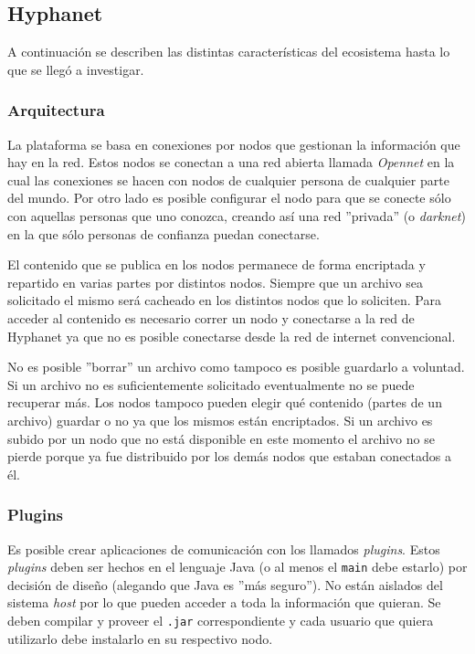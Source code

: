 \subsection{Hyphanet}

A continuación se describen las distintas características del ecosistema hasta lo que se llegó a investigar.

\subsubsection{Arquitectura}

La plataforma se basa en conexiones por nodos que gestionan la información que hay en la red. Estos nodos se conectan a una red abierta llamada \textit{Opennet} en la cual las conexiones se hacen con nodos de cualquier persona de cualquier parte del mundo. Por otro lado es posible configurar el nodo para que se conecte sólo con aquellas personas que uno conozca, creando así una red ''privada'' (o \textit{darknet}) en la que sólo personas de confianza puedan conectarse.

El contenido que se publica en los nodos permanece de forma encriptada y repartido en varias partes por distintos nodos. Siempre que un archivo sea solicitado el mismo será cacheado en los distintos nodos que lo soliciten. Para acceder al contenido es necesario correr un nodo y conectarse a la red de Hyphanet ya que no es posible conectarse desde la red de internet convencional.

No es posible ''borrar'' un archivo como tampoco es posible guardarlo a voluntad. Si un archivo no es suficientemente solicitado eventualmente no se puede recuperar más. Los nodos tampoco pueden elegir qué contenido (partes de un archivo) guardar o no ya que los mismos están encriptados. Si un archivo es subido por un nodo que no está disponible en este momento el archivo no se pierde porque ya fue distribuido por los demás nodos que estaban conectados a él.

\subsubsection{Plugins}

Es posible crear aplicaciones de comunicación con los llamados \textit{plugins}. Estos \textit{plugins} deben ser hechos en el lenguaje Java (o al menos el \texttt{main} debe estarlo) por decisión de diseño (alegando que Java es ''más seguro''). No están aislados del sistema \textit{host} por lo que pueden acceder a toda la información que quieran. Se deben compilar y proveer el \texttt{.jar} correspondiente y cada usuario que quiera utilizarlo debe instalarlo en su respectivo nodo.

